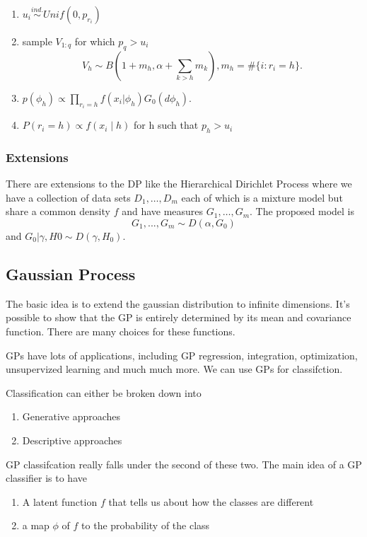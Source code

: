 \documentclass[twoside]{article}
\begin{document}
\begin{enumerate}
  \item $u_i \stackrel{ind.}{\sim} Unif(0, p_{r_i})$
  \item sample $V_{1:q}$ for which $p_q > u_i$
\[V_h \sim B(1 + m_h, \alpha+\sum_{k>h}m_k), m_h = \#\{i : r_i = h\}.\]
\item $p(\phi_h) \propto \prod_{r_i=h} f(x_i|\phi_h)G_0(d\phi_h)$.
    \item $P(r_i = h) \propto f(x_i\mid h)$ for h such that $p_h > u_i$
\end{enumerate}

\subsubsection{Extensions}

There are extensions to the DP like the Hierarchical Dirichlet Process where we have a collection of data sets $D_1,\ldots,D_m$ each of which is a mixture model but share a common density $f$ and have measures $G_1,\ldots,G_m$. The proposed model is
\[
G_1,..., G_m \sim D(\alpha, G_0)
\]
and $G_0|\gamma,H0 \sim D(\gamma,H_0)$.

\subsection{Gaussian Process}

The basic idea is to extend the gaussian distribution to infinite dimensions. It's possible to show that the GP is entirely determined by its mean and covariance function. There are many choices for these functions.

GPs have lots of applications, including GP regression, integration, optimization, unsupervized learning and much much more. We can use GPs for classifction.

Classification can either be broken down into
\begin{enumerate}
\item Generative approaches
\item Descriptive approaches
\end{enumerate}

GP classifcation really falls under the second of these two. The main idea of a GP classifier is to have
\begin{enumerate}
\item A latent function $f$ that tells us about how the classes are different
  \item a map $\phi$ of $f$ to the probability of the class
\end{enumerate}
\end{document}
